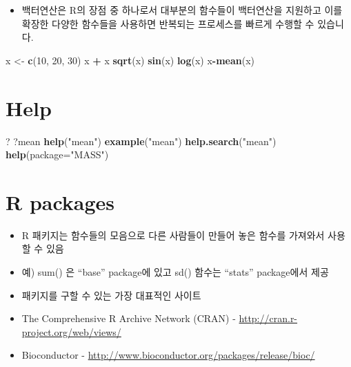 \documentclass[
]{book}
\newenvironment{Shaded}{\begin{snugshade}}{\end{snugshade}}
\newcommand{\DataTypeTok}[1]{\textcolor[rgb]{0.13,0.29,0.53}{#1}}
\newcommand{\DecValTok}[1]{\textcolor[rgb]{0.00,0.00,0.81}{#1}}
\newcommand{\KeywordTok}[1]{\textcolor[rgb]{0.13,0.29,0.53}{\textbf{#1}}}
\newcommand{\NormalTok}[1]{#1}
\newcommand{\OperatorTok}[1]{\textcolor[rgb]{0.81,0.36,0.00}{\textbf{#1}}}
\newcommand{\StringTok}[1]{\textcolor[rgb]{0.31,0.60,0.02}{#1}}
\providecommand{\tightlist}{%
  \setlength{\itemsep}{0pt}\setlength{\parskip}{0pt}}
\begin{document}
\begin{itemize}
\tightlist
\item
  백터연산은 R의 장점 중 하나로서 대부분의 함수들이 백터연산을 지원하고 이를 확장한 다양한 함수들을 사용하면 반복되는 프로세스를 빠르게 수행할 수 있습니다.
\end{itemize}

\begin{Shaded}
\begin{Highlighting}[]
\NormalTok{x <{-}}\StringTok{ }\KeywordTok{c}\NormalTok{(}\DecValTok{10}\NormalTok{, }\DecValTok{20}\NormalTok{, }\DecValTok{30}\NormalTok{)}
\NormalTok{x }\OperatorTok{+}\StringTok{ }\NormalTok{x}
\KeywordTok{sqrt}\NormalTok{(x)}
\KeywordTok{sin}\NormalTok{(x)}
\KeywordTok{log}\NormalTok{(x)}
\NormalTok{x}\OperatorTok{{-}}\KeywordTok{mean}\NormalTok{(x)}
\end{Highlighting}
\end{Shaded}

\hypertarget{help}{%
\section{Help}\label{help}}

\begin{Shaded}
\begin{Highlighting}[]
\NormalTok{?}
\NormalTok{?mean}
\KeywordTok{help}\NormalTok{(}\StringTok{"mean"}\NormalTok{)}
\KeywordTok{example}\NormalTok{(}\StringTok{"mean"}\NormalTok{)}
\KeywordTok{help.search}\NormalTok{(}\StringTok{"mean"}\NormalTok{)}
\KeywordTok{help}\NormalTok{(}\DataTypeTok{package=}\StringTok{"MASS"}\NormalTok{)}
\end{Highlighting}
\end{Shaded}

\hypertarget{r-packages}{%
\section{R packages}\label{r-packages}}

\begin{itemize}
\tightlist
\item
  R 패키지는 함수들의 모음으로 다른 사람들이 만들어 놓은 함수를 가져와서 사용할 수 있음
\item
  예) sum() 은 ``base'' package에 있고 sd() 함수는 ``stats'' package에서 제공
\item
  패키지를 구할 수 있는 가장 대표적인 사이트
\item
  The Comprehensive R Archive Network (CRAN) - \url{http://cran.r-project.org/web/views/}
\item
  Bioconductor - \url{http://www.bioconductor.org/packages/release/bioc/}
\end{itemize}
\end{document}
